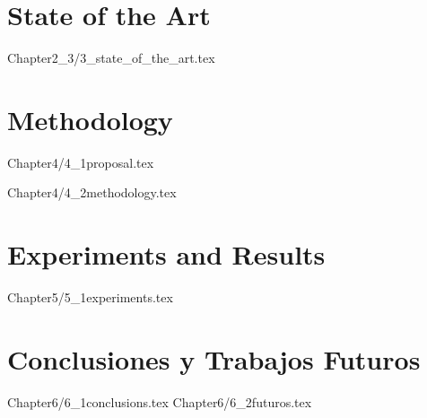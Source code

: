 \documentclass{report}
\begin{document}
\chapter{State of the Art}
{Chapter2_3/3_state_of_the_art.tex}


\chapter{Methodology}
{Chapter4/4_1proposal.tex}

{Chapter4/4_2methodology.tex}





\chapter{Experiments and Results}
 {Chapter5/5_1experiments.tex}



\chapter{Conclusiones y Trabajos Futuros}

{Chapter6/6_1conclusions.tex}
{Chapter6/6_2futuros.tex}








%


% 



\newpage

\end{document}
